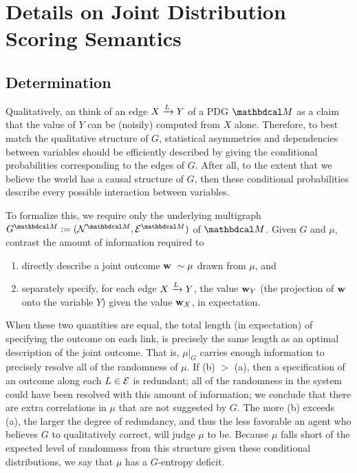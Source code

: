 \documentclass[the-pdg-manual.tex]{subfiles}
\begin{document}
	\section{Details on Joint Distribution Scoring Semantics}\label{sec:details-on-joint-scoring}
	\subsection{Determination}

	Qualitatively, an think of an edge $\ed LXY$ of a PDG $\dg M$ as a claim that the value of $Y$ can be (noisily) computed from
	$X$ alone.  
	Therefore, to best match the qualitative structure of $G$, statistical asymmetries and dependencies between variables should
	be efficiently described by giving the conditional probabilities corresponding to the edges of $G$. After all, to the extent that we believe the world has a causal structure of $G$, then these conditional probabilities describe every possible interaction between variables. 

	To formalize this, we require only the underlying multigraph $G^{\dg M} :=
	(\N^{\dg M}, \Ed^{\dg M})$ of $\dg M$. 
	Given $G$ and $\mu$, contrast the amount of
	information required to 
	\begin{enumerate}[label=(\alph*)]
		\item directly describe a joint outcome  $\mathbf w ~ \sim \mu$
		drawn from $\mu$, and 
		\item separately specify, for each edge $\ed LXY$, the value
		$\mathbf w_Y$ (the projection of $\mathbf w$ onto the variable
		$Y$) given the value $\mathbf w_X$, in expectation. 
	\end{enumerate}
	When these two quantities are equal, the total length (in expectation) of specifying the outcome on each link, is precisely the same length as an optimal description of the joint outcome. That is, $\mu|_G$ carries enough information to precisely resolve all of the randomness of $\mu$. If (b) $>$ (a), then a specification of an outcome along each $L \in \mathcal E$ is redundant; all of the randomness in the system could have been resolved with this amount of information; we conclude that there are extra correlations in $\mu$ that are not suggested by $G$. The more (b) exceeds (a), the larger the degree of redundancy, and thus the less favorable an agent who believes $G$ to qualitatively correct, will judge $\mu$ to be. Because $\mu$ falls short of the expected level of randomness from this structure given these conditional distributions, we say that $\mu$ has a $G$-entropy deficit.
\end{document}
